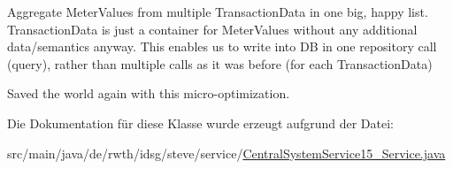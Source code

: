 Aggregate Meter\+Values from multiple Transaction\+Data in one big, happy list. Transaction\+Data is just a container for Meter\+Values without any additional data/semantics anyway. This enables us to write into D\+B in one repository call (query), rather than multiple calls as it was before (for each Transaction\+Data)

Saved the world again with this micro-\/optimization.

Die Dokumentation für diese Klasse wurde erzeugt aufgrund der Datei\+:\begin{DoxyCompactItemize}
\item 
src/main/java/de/rwth/idsg/steve/service/\hyperlink{_central_system_service15___service_8java}{Central\+System\+Service15\+\_\+\+Service.\+java}\end{DoxyCompactItemize}
